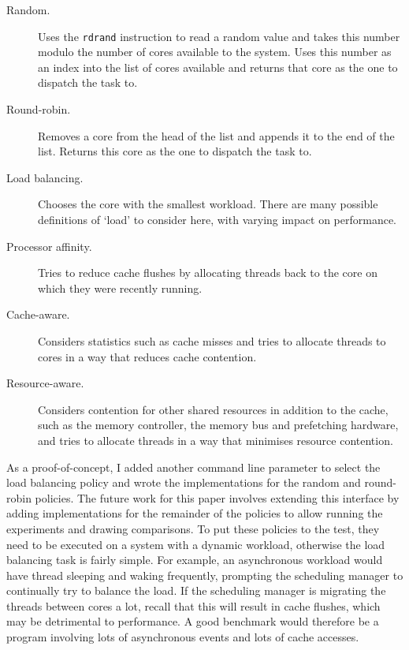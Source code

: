 \documentclass[bsc,frontabs,singlespacing,parskip,deptreport]{infthesis}
\begin{document}
\begin{description}
\item[Random.] Uses the \verb|rdrand| instruction to read a random value and takes this number modulo the number of cores available to the system. Uses this number as an index into the list of cores available and returns that core as the one to dispatch the task to.
\item[Round-robin.] Removes a core from the head of the list and appends it to the end of the list. Returns this core as the one to dispatch the task to.
\item[Load balancing.] Chooses the core with the smallest workload. There are many possible definitions of `load' to consider here, with varying impact on performance.
\item[Processor affinity.] Tries to reduce cache flushes by allocating threads back to the core on which they were recently running.
\item[Cache-aware.] Considers statistics such as cache misses and tries to allocate threads to cores in a way that reduces cache contention.
\item[Resource-aware.] Considers contention for other shared resources in addition to the cache, such as the memory controller, the memory bus and prefetching hardware, and tries to allocate threads in a way that minimises resource contention.
\end{description}

As a proof-of-concept, I added another command line parameter to select the load balancing policy and wrote the implementations for the random and round-robin policies. The future work for this paper involves extending this interface by adding implementations for the remainder of the policies to allow running the experiments and drawing comparisons. To put these policies to the test, they need to be executed on a system with a dynamic workload, otherwise the load balancing task is fairly simple. For example, an asynchronous workload would have thread sleeping and waking frequently, prompting the scheduling manager to continually try to balance the load. If the scheduling manager is migrating the threads between cores a lot, recall that this will result in cache flushes, which may be detrimental to performance. A good benchmark would therefore be a program involving lots of asynchronous events and lots of cache accesses.
\end{document}
